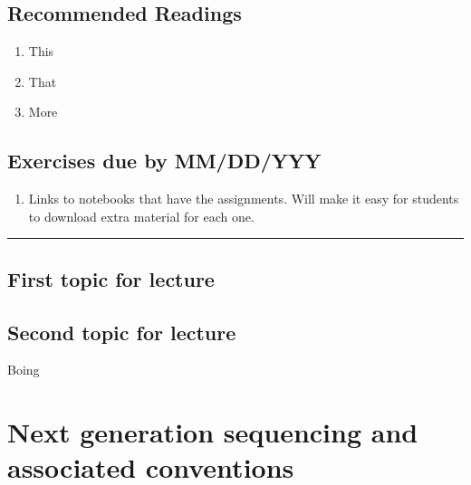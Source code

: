 \documentclass[]{book}
\providecommand{\tightlist}{%
  \setlength{\itemsep}{0pt}\setlength{\parskip}{0pt}}
\begin{document}
\hypertarget{recommended-readings-1}{%
\section*{Recommended Readings}\label{recommended-readings-1}}

\begin{enumerate}
\def\labelenumi{\arabic{enumi}.}
\tightlist
\item
  This
\item
  That
\item
  More
\end{enumerate}

\hypertarget{exercises-due-by-mmddyyy-1}{%
\section*{Exercises due by MM/DD/YYY}\label{exercises-due-by-mmddyyy-1}}

\begin{enumerate}
\def\labelenumi{\arabic{enumi}.}
\tightlist
\item
  Links to notebooks that have the assignments. Will make it
  easy for students to download extra material for each one.
\end{enumerate}

\begin{center}\rule{0.5\linewidth}{\linethickness}\end{center}

\hypertarget{first-topic-for-lecture}{%
\section{First topic for lecture}\label{first-topic-for-lecture}}

\hypertarget{second-topic-for-lecture}{%
\section{Second topic for lecture}\label{second-topic-for-lecture}}

Boing

\hypertarget{next-generation-sequencing-and-associated-conventions}{%
\chapter{Next generation sequencing and associated conventions}\label{next-generation-sequencing-and-associated-conventions}}
\end{document}
